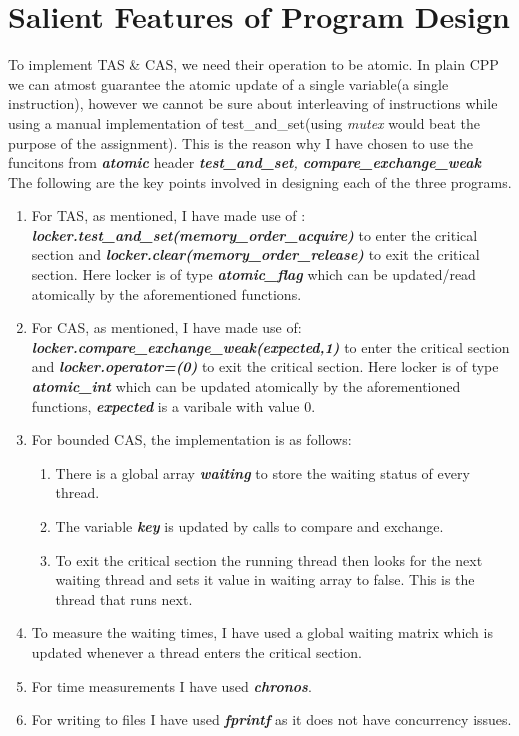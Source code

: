 \documentclass[a4paper,12pt]{report}
\begin{document}
\section{Salient Features of Program Design}
To implement TAS \& CAS, we need their operation to be atomic. In plain CPP we can atmost guarantee the atomic update of a single variable(a single instruction), however we cannot be sure about interleaving of instructions while using a  manual implementation of test\_and\_set(using \textit{mutex} would beat the purpose of the assignment). This is the reason why I have chosen to use the funcitons from \textit{\textbf{atomic}} header \textit{\textbf{test\_and\_set}, \textbf{compare\_exchange\_weak}}\\
The following are the key points involved in designing each of the three programs.
\begin{enumerate}
\item For TAS, as mentioned, I have made use of :\\ \textbf{\textit{locker.test\_and\_set(memory\_order\_acquire)}} to enter the critical section and \textbf{\textit{locker.clear(memory\_order\_release)}} to exit the critical section. Here locker is of type \textbf{\textit{atomic\_flag}} which can be updated/read atomically by the aforementioned functions.
\item For CAS, as mentioned, I have made use of: \\ \textbf{\textit{locker.compare\_exchange\_weak(expected,1)}} to enter the critical section and \textbf{\textit{locker.operator=(0)}} to exit the critical section. Here locker is of type \textbf{\textit{atomic\_int}} which can be updated atomically by the aforementioned functions, \textbf{\textit{expected}} is a varibale with value 0.
\item For bounded CAS, the implementation is as follows:
\begin{enumerate}
\item There is a global array \textbf{\textit{waiting}} to store the waiting status of every thread.
\item The variable \textbf{\textit{key}} is updated by calls to compare and exchange.
\item To exit the critical section the running thread then looks for the next waiting thread and sets it value in waiting array to false. This is the thread that runs next.
\end{enumerate}
\item To measure the waiting times, I have used a global waiting matrix which is updated whenever a thread enters the critical section.
\item For time measurements I have used \textbf{\textit{chronos}}.
\item For writing to files I have used \textbf{\textit{fprintf}} as it does not have concurrency issues.
\end{enumerate}
\newpage
\end{document}
